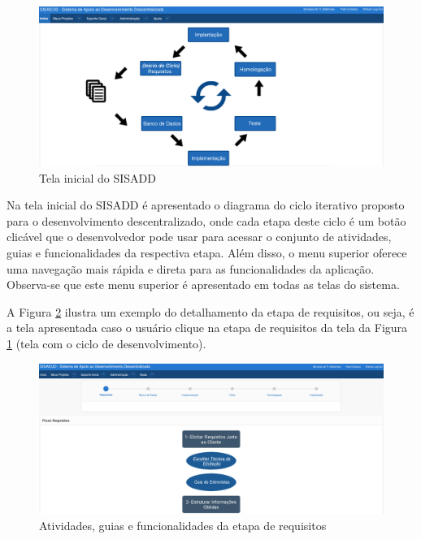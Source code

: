 \begin{figure}[!h]
	\hspace*{-1.5cm} 
		\includegraphics[scale=0.40]{figuras/home_p1}
	\caption{Tela inicial do SISADD}
	\label{tela_inicial_sisadd}
\end{figure}

Na tela inicial do SISADD é apresentado o diagrama do ciclo iterativo proposto para o desenvolvimento descentralizado, onde cada etapa deste ciclo é um botão clicável que o desenvolvedor pode usar para acessar o conjunto de atividades, guias e funcionalidades da respectiva etapa. Além disso, o menu superior oferece uma navegação mais rápida e direta para as funcionalidades da aplicação. Observa-se que este menu superior é apresentado em todas as telas do sistema.

A Figura \ref{ativ_guias_func_sisadd} ilustra um exemplo do detalhamento da etapa de requisitos, ou seja, é a tela apresentada caso o usuário clique na etapa de requisitos da tela da Figura \ref{tela_inicial_sisadd} (tela com o ciclo de desenvolvimento).

\begin{figure}[!htb]
	\hspace*{-1.5cm} 
		\includegraphics[scale=0.40]{figuras/fluxo_req_p2}
	\caption{Atividades, guias e funcionalidades da etapa de requisitos}
	\label{ativ_guias_func_sisadd}
\end{figure}

